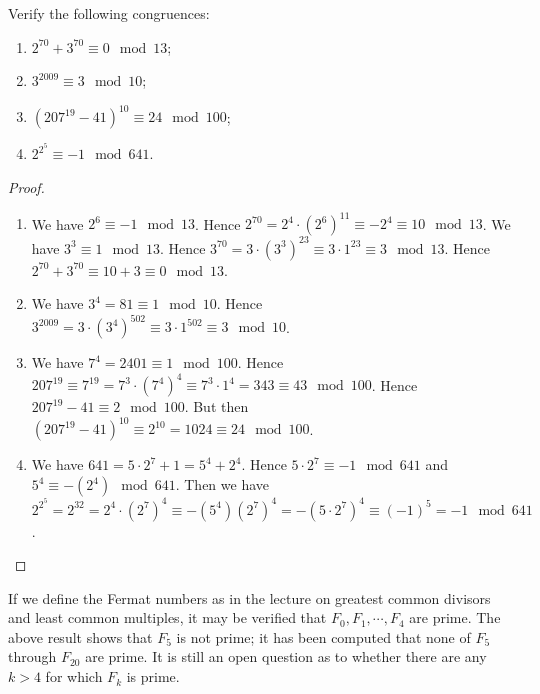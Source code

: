 \begin{prb}
Verify the following congruences:
\begin{enumerate}
\item $2^{70}+3^{70}\equiv0\mod{13}$;
\item $3^{2009}\equiv3\mod{10}$;
\item $(207^{19}-41)^{10}\equiv24\mod{100}$;
\item $2^{2^5}\equiv-1\mod{641}$.
\end{enumerate}
\begin{proof}
\begin{enumerate}
\item We have $2^6\equiv-1\mod{13}$.  Hence $2^{70} = 2^4\cdot(2^6)^{11}\equiv-2^4\equiv10\mod{13}$.  We have $3^3\equiv1\mod{13}$.  Hence $3^{70}=3\cdot(3^3)^{23}\equiv3\cdot1^{23}\equiv3\mod{13}$.  Hence $2^{70}+3^{70}\equiv10+3\equiv0\mod{13}$.
\item We have $3^4=81\equiv1\mod{10}$.  Hence $3^{2009} = 3\cdot(3^4)^{502}\equiv3\cdot1^{502}\equiv3\mod{10}$.
\item We have $7^4 = 2401\equiv1\mod{100}$.  Hence $207^{19}\equiv7^{19}=7^3\cdot(7^4)^4\equiv7^3\cdot1^4=343\equiv43\mod{100}$.  Hence $207^{19}-41\equiv2\mod{100}$.  But then $(207^{19}-41)^{10}\equiv2^{10}=1024\equiv24\mod{100}$.
\item We have $641 = 5\cdot2^7+1 = 5^4+2^4$.  Hence $5\cdot2^7\equiv-1\mod{641}$ and $5^4\equiv-(2^4)\mod{641}$.  Then we have $2^{2^5} = 2^{32} = 2^4\cdot(2^7)^4\equiv-(5^4)(2^7)^4=-(5\cdot2^7)^4\equiv(-1)^5=-1\mod{641}$.
\end{enumerate}
\end{proof}
\end{prb}
\begin{rem}If we define the Fermat numbers as in the lecture on greatest common divisors and least common multiples, it may be verified that $F_0, F_1,\cdots, F_4$ are prime.  The above result shows that $F_5$ is not prime; it has been computed that none of $F_5$ through $F_{20}$ are prime.  It is still an open question as to whether there are any $k > 4$ for which $F_k$ is prime.\end{rem}
